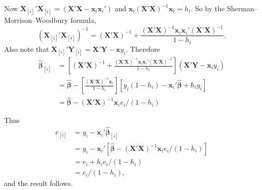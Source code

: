 \documentclass[11pt]{article}
\begin{document}
Now $\bm{X}_{[i]}'\bm{X}_{[i]} = (\bm{X}'\bm{X} - \bm{x}_i\bm{x}_i')$ and $\bm{x}_i(\bm{X}'\bm{X})^{-1}\bm{x}_i = h_i$. So by the Sherman--Morrison--Woodbury formula,
\[
(\bm{X}_{[i]}'\bm{X}_{[i]})^{-1} = (\bm{X}'\bm{X})^{-1} + \frac{(\bm{X}'\bm{X})^{-1}\bm{x}_i\bm{x}_i'(\bm{X}'\bm{X})^{-1}}{1-h_i}.
\]
Also note that $\bm{X}_{[i]}' \bm{Y}_{[i]} = \bm{X}'\bm{Y} - \bm{x}y_i$.
Therefore
\begin{align*}
\bm{\hat{\beta}}_{[i]} 
&=  \left[ (\bm{X}'\bm{X})^{-1}  + \frac{ (\bm{X}'\bm{X})^{-1}\bm{x}_i\bm{x}_i'(\bm{X}'\bm{X})^{-1} }{1-h_i} \right] (\bm{X}'\bm{Y} - \bm{x}_i y_i)\\
&=  \hat{\bm{\beta}} - \left[ \frac{ (\bm{X}'\bm{X})^{-1}\bm{x}_i}{1-h_i}\right] \left[y_i(1-h_i) -  \bm{x}_i' \hat{\bm{\beta}} +h_i y_i \right]\\
&=  \hat{\bm{\beta}} - (\bm{X}'\bm{X})^{-1}\bm{x}_i e_i / (1-h_i)
\end{align*}

Thus
\begin{align*}
e_{[i]} &= y_i - \bm{x}_i'\hat{\bm{\beta}}_{[i]} \\
& = y_i - \bm{x}_i' \left[ \hat{\bm{\beta}} - (\bm{X}'\bm{X})^{-1}\bm{x}_ie_i/(1-h_i)\right] \\
&= e_i + h_i e_i/(1-h_i) \\
&= e_i/(1-h_i),
\end{align*}
and the result follows.

\printbibliography
\end{document}
